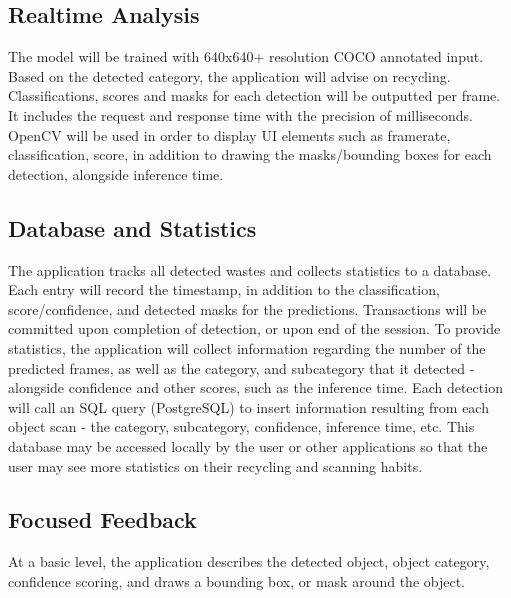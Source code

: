 \documentclass[conference]{IEEEtran}
\begin{document}
\subsection{Realtime Analysis}
The model will be trained with 640x640+ resolution COCO annotated input. Based on the detected category, the application will advise on recycling. Classifications, scores and masks for each detection will be outputted per frame. It includes the request and response time with the precision of milliseconds. 
\newline
OpenCV will be used in order to display UI elements such as framerate, classification, score, in addition to drawing the masks/bounding boxes for each detection, alongside inference time.

\subsection{Database and Statistics}
The application tracks all detected wastes and collects statistics to a database. Each entry will record the timestamp, in addition to the classification, score/confidence, and detected masks for the predictions. Transactions will be committed upon completion of detection, or upon end of the session.
\newline
To provide statistics, the application will collect information regarding the number of the predicted frames, as well as the category, and subcategory that it detected - alongside confidence and other scores, such as the inference time.
\newline
Each detection will call an SQL query (PostgreSQL) to insert information resulting from each object scan - the category, subcategory, confidence, inference time, etc. This database may be accessed locally by the user or other applications so that the user may see more statistics on their recycling and scanning habits.

\subsection{Focused Feedback}
At a basic level, the application describes the detected object, object category, confidence scoring, and draws a bounding box, or mask around the object.
\end{document}
